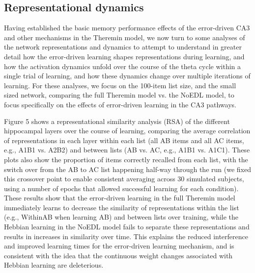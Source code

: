 \documentclass[11pt,twoside]{article}
\newif\myifpdf
\begin{document}
\subsection{Representational dynamics}

Having established the basic memory performance effects of the error-driven CA3 and other mechanisms in the Theremin model, we now turn to some analyses of the network representations and dynamics to attempt to understand in greater detail how the error-driven learning shapes representations during learning, and how the activation dynamics unfold over the course of the theta cycle within a single trial of learning, and how these dynamics change over multiple iterations of learning.  For these analyses, we focus on the 100-item list size, and the small sized network, comparing the full Theremin model vs. the NoEDL model, to focus specifically on the effects of error-driven learning in the CA3 pathways.

Figure 5 shows a representational similarity analysis (RSA) of the different hippocampal layers over the course of learning, comparing the average correlation of representations in each layer within each list (all AB items and all AC items, e.g., A1B1 vs. A2B2) and between lists (AB vs. AC, e.g., A1B1 vs. A1C1).  These plots also show the proportion of items correctly recalled from each list, with the switch over from the AB to AC list happening half-way through the run (we fixed this crossover point to enable consistent averaging across 30 simulated subjects, using a number of epochs that allowed successful learning for each condition).  These results show that the error-driven learning in the full Theremin model immediately learns to decrease the similarity of representations within the list (e.g., WithinAB when learning AB) and between lists over training, while the Hebbian learning in the NoEDL model fails to separate these representations and results in increases in similarity over time.  This explains the reduced interference and improved learning times for the error-driven learning mechanism, and is consistent with the idea that the continuous weight changes associated with Hebbian learning are deleterious.
\end{document}
